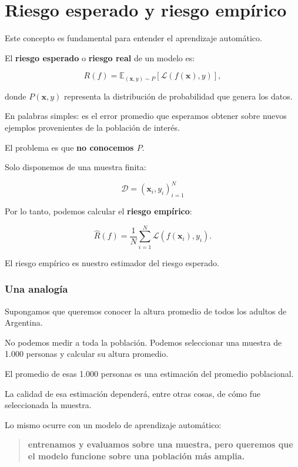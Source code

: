 \documentclass[
  letterpaper,
  DIV=11,
  numbers=noendperiod]{scrartcl}
\begin{document}
\section{Riesgo esperado y riesgo
empírico}\label{riesgo-esperado-y-riesgo-empuxedrico}

Este concepto es fundamental para entender el aprendizaje automático.

El \textbf{riesgo esperado} o \textbf{riesgo real} de un modelo es:

\[
R(f)
=
\mathbb{E}_{(\mathbf{x},y)\sim P}
\left[
\mathcal{L}(f(\mathbf{x}),y)
\right],
\]

donde \(P(\mathbf{x},y)\) representa la distribución de probabilidad que
genera los datos.

En palabras simples: es el error promedio que esperamos obtener sobre
nuevos ejemplos provenientes de la población de interés.

El problema es que \textbf{no conocemos \(P\)}.

Solo disponemos de una muestra finita:

\[
\mathcal{D}
=
{(\mathbf{x}_ i,y_i)}_{i=1}^{N}
\]

Por lo tanto, podemos calcular el \textbf{riesgo empírico}:

\[
\hat R(f)
=
\frac{1}{N}
\sum_{i=1}^{N}
\mathcal{L}
\left(
f(\mathbf{x}_i),y_i
\right).
\]

El riesgo empírico es nuestro estimador del riesgo esperado.

\subsubsection{Una analogía}\label{una-analoguxeda}

Supongamos que queremos conocer la altura promedio de todos los adultos
de Argentina.

No podemos medir a toda la población. Podemos seleccionar una muestra de
1.000 personas y calcular su altura promedio.

El promedio de esas 1.000 personas es una estimación del promedio
poblacional.

La calidad de esa estimación dependerá, entre otras cosas, de cómo fue
seleccionada la muestra.

Lo mismo ocurre con un modelo de aprendizaje automático:

\begin{quote}
\textbf{entrenamos y evaluamos sobre una muestra, pero queremos que el
modelo funcione sobre una población más amplia.}
\end{quote}
\end{document}
